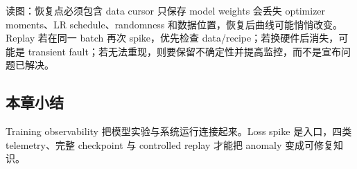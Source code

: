 
\begin{knowledgebox}{读图：恢复点必须包含 data cursor}
只保存 model weights 会丢失 optimizer moments、LR schedule、randomness 和数据位置，恢复后曲线可能悄悄改变。Replay 若在同一 batch 再次 spike，优先检查 data/recipe；若换硬件后消失，可能是 transient fault；若无法重现，则要保留不确定性并提高监控，而不是宣布问题已解决。
\end{knowledgebox}


\subsection{本章小结}

Training observability 把模型实验与系统运行连接起来。Loss spike 是入口，四类 telemetry、完整 checkpoint 与 controlled replay 才能把 anomaly 变成可修复知识。


